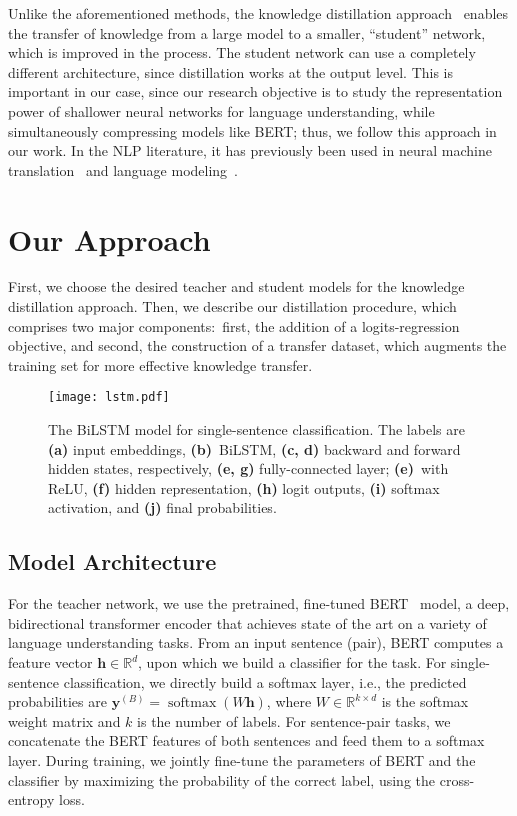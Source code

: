 \documentclass[11pt,a4paper]{article}
\newcommand\caplbl[1]{\textbf{(#1)}}
\DeclareMathOperator*{\softmax}{softmax}
\begin{document}
Unlike the aforementioned methods, the knowledge distillation approach~\cite{ba2014deep,hinton2015distilling} enables the transfer of knowledge from a large model to a smaller, ``student'' network, which is improved in the process.
The student network can use a completely different architecture, since distillation works at the output level.
This is important in our case, since our research objective is to study the representation power of shallower neural networks for language understanding, while simultaneously compressing models like BERT; thus, we follow this approach in our work.
In the NLP literature, it has previously been used in neural machine translation~\cite{kim2016sequence} and language modeling~\cite{yu2018device}.






\section{Our Approach}

First, we choose the desired teacher and student models for the knowledge distillation approach. Then, we describe our distillation procedure, which comprises two major components:~first, the addition of a logits-regression objective, and second, the construction of a transfer dataset, which augments the training set for more effective knowledge transfer.

\begin{figure}
    \centering
    \texttt{[image: lstm.pdf]}
    \caption{The BiLSTM model for single-sentence classification. The labels are \caplbl{a} input embeddings, \caplbl{b}~BiLSTM, \caplbl{c, d} backward and forward hidden states, respectively, \caplbl{e, g} fully-connected layer; \caplbl{e}~with ReLU, \caplbl{f} hidden representation, \caplbl{h} logit outputs, \caplbl{i} softmax activation, and \caplbl{j} final probabilities.}
    \label{fig:bilstm}
\end{figure}
\subsection{Model Architecture}
For the teacher network, we use the pretrained, fine-tuned BERT~\cite{devlin2018bert} model, a deep, bidirectional transformer encoder that achieves state of the art on a variety of language understanding tasks. 
From an input sentence (pair), BERT computes a feature vector $\bm h\in\mathbb{R}^{d}$, upon which we build a classifier for the task. For single-sentence classification, we directly build a softmax layer, i.e., the predicted probabilities are $\bm y^{(B)}=\softmax(W\bm h)$, where $W\in\mathbb{R}^{k\times d}$ is the softmax weight matrix and $k$ is the number of labels. For sentence-pair tasks, we concatenate the BERT features of both sentences and feed them to a softmax layer. During training, we jointly fine-tune the parameters of BERT and the classifier by maximizing the probability of the correct label, using the cross-entropy loss.
\end{document}
